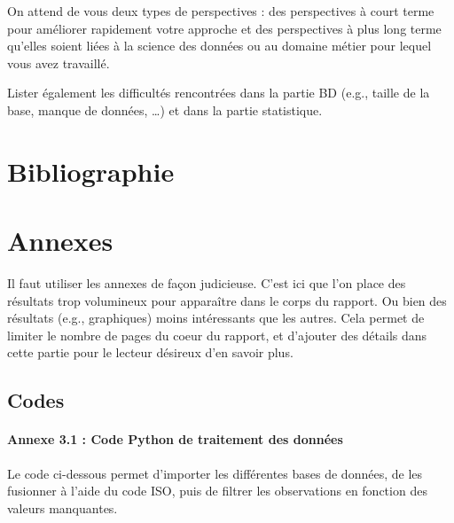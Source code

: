 \documentclass[mstat,12pt]{unswthesis}
\begin{document}
On attend de vous deux types de perspectives : des perspectives à court
terme pour améliorer rapidement votre approche et des perspectives à
plus long terme qu'elles soient liées à la science des données ou au
domaine métier pour lequel vous avez travaillé.

\bigskip

Lister également les difficultés rencontrées dans la partie BD (e.g.,
taille de la base, manque de données, \ldots) et dans la partie
statistique.

\chapter*{Bibliographie}\label{bibliographie}

\label{refs}




\chapter*{Annexes}\label{annexes}

Il faut utiliser les annexes de façon judicieuse. C'est ici que l'on
place des résultats trop volumineux pour apparaître dans le corps du
rapport. Ou bien des résultats (e.g., graphiques) moins intéressants que
les autres. Cela permet de limiter le nombre de pages du coeur du
rapport, et d'ajouter des détails dans cette partie pour le lecteur
désireux d'en savoir plus.

\section*{\texorpdfstring{\textbf{Codes}}{Codes}}\label{codes}

\subsubsection{\texorpdfstring{\textbf{Annexe 3.1} : Code Python de
traitement des
données}{Annexe 3.1 : Code Python de traitement des données}}\label{sec-annexe-3.1--code-python-de-traitement-des-donnuxe9es}

Le code ci-dessous permet d'importer les différentes bases de données,
de les fusionner à l'aide du code ISO, puis de filtrer les observations
en fonction des valeurs manquantes.
\end{document}
